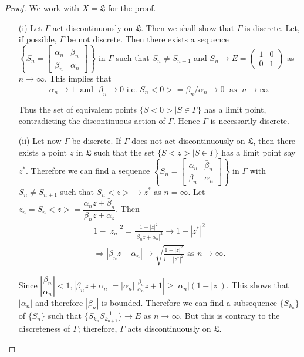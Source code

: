 \begin{proof}
We work \pageoriginale with $X=\mathfrak{L}$ for the proof.
\begin{itemize}
\item[{\rm (i)}] Let $\Gamma$ act discontinuously on
  $\mathfrak{L}$. Then we shall show that $\Gamma$ is discrete. Let,
  if possible, $\Gamma$ be not discrete. Then there exists a 
sequence $ \left\{ S_n = \begin{bmatrix}
\bar{\alpha}_n & \bar{\beta}_n\\
\beta_n & \alpha_n\end{bmatrix}\right\}$ in $\Gamma$ such
  that $S_n \neq S_{n+1} $ and $S_n \to E = \begin{pmatrix}1&0\\
0&1\end{pmatrix}$ as $n\to\infty$. This implies that
$$
\alpha_n \to 1 \; \text{ and } \;  \beta_n \to 0 \text{ i.e. }
S_n<0>=\bar{\beta}_n/ \alpha_n \to 0\;  \text{ as }\;  n \to \infty.
$$

Thus the set of equivalent points $\{S<0>|S\in \Gamma\}$ has a
limit point, contradicting the discontinuous action of $\Gamma$. Hence
$\Gamma$ is necessarily discrete.

\item[{\rm (ii)}] Let now $\Gamma$ be discrete. If $\Gamma$ does not
  act discontinuously on $\mathfrak{L}$, then there exists a point $z$
  in $\mathfrak{L}$ such that the set $\{S<z>|S\in \Gamma\}$
  has a limit point say $z^{\ast}$. Therefore we can find a sequence
$\left\{ S_n = \begin{bmatrix}
\bar{\alpha}_n & \bar{\beta}_n\\
\beta_n & \alpha_n  \end{bmatrix}  \right\}$ in $\Gamma$ with $S_n
  \neq S_{n+1}$ such that $S_n <z> \to z^{\ast}$ as $n =  \infty$. Let
  $z_n = S_n <z> = \dfrac{\bar{\alpha}_nz+\bar{\beta}_n}{\beta_n z +
    \alpha_z}$. Then 
\begin{gather*}
1-|z_n|^2 = \frac{1-|z|^2}{|\beta_nz+\alpha_n|^2} \to 1
-|z^{\ast}|^2\\
\Longrightarrow |\beta_n z + \alpha_n| \to
\sqrt{\frac{1-|z|^2}{l-|z^{\ast}|^2}} \text{ as } n \to \infty.
\end{gather*}

Since $\left|\dfrac{\beta_n}{\alpha_n}\right| < 1, |\beta_n z +
\alpha_n| = |\alpha_n| \left|\frac{\beta_n}{\alpha_n} z+1\right| \geq
|\alpha_n| (1-|z|)$. This shows that $|\alpha_n|$ and therefore
$|\beta_n|$ is bounded. Therefore we can find a subsequence
$\{S_{k_n}\}$ of $\{S_n\}$ such that $\{S_{k_n} S^{-1}_{k_{n+1}}\} \to
E$ as $n\to \infty$. But this is contrary to the discreteness of
$\Gamma$; therefore, $\Gamma$ acts discontinuously on $\mathfrak{L}$.
\end{itemize}
\end{proof}

